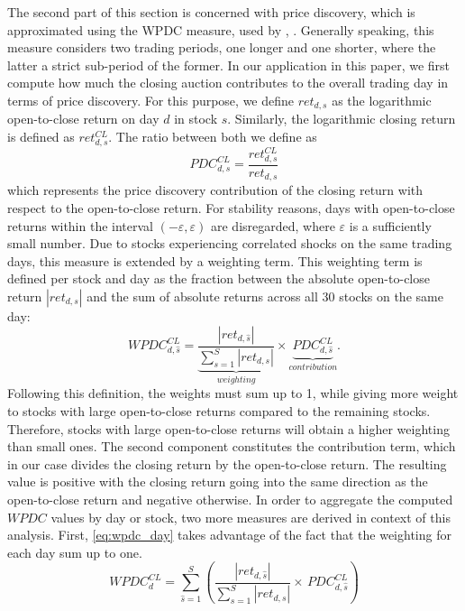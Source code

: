 \documentclass[11pt,a4paper, notitlepage]{article}
\begin{document}
	The second part of this section is concerned with price discovery, which is approximated using the \ac{WPDC} measure, used by \textcite{BarclayWarner1993}, \textcite{BarclayHendershott2003}. Generally speaking, this measure considers two trading periods, one longer and one shorter, where the latter a strict sub-period of the former. In our application in this paper, we first compute how much the closing auction contributes to the overall trading day in terms of price discovery. For this purpose, we define $ret_{d,s}$ as the logarithmic open-to-close return on day $d$ in stock $s$. Similarly, the logarithmic closing return is defined as $ret^{CL}_{d,s}$. The ratio between both we define as
	\begin{equation*}
		PDC^{CL}_{d,s} = \frac{ret^{CL}_{d,s}}{ret_{d,s}}
	\end{equation*}
	which represents the price discovery contribution of the closing return with respect to the open-to-close return. For stability reasons, days with open-to-close returns within the interval $(-\varepsilon, \varepsilon)$ are disregarded, where $\varepsilon$ is a sufficiently small number. Due to stocks experiencing correlated shocks on the same trading days, this measure is extended by a weighting term. This weighting term is defined per stock and day as the fraction between the absolute open-to-close return $|ret_{d,s}|$ and the sum of absolute returns across all 30 stocks on the same day:
	\begin{equation}
		\label{eq:wpdc_base}
		WPDC^{CL}_{d,\hat{s}} = \underbrace{\frac{|ret_{d,\hat{s}}|}{\sum_{s=1}^{S} |ret_{d,s}|}}_{weighting}  \times \underbrace{PDC^{CL}_{d,\hat{s}}}_{contribution}.
	\end{equation}
	Following this definition, the weights must sum up to 1, while giving more weight to stocks with large open-to-close returns compared to the remaining stocks. Therefore, stocks with large open-to-close returns will obtain a higher weighting than small ones. The second component constitutes the contribution term, which in our case divides the closing return by the open-to-close return. The resulting value is positive with the closing return going into the same direction as the open-to-close return and negative otherwise. In order to aggregate the computed $WPDC$ values by day or stock, two more measures are derived in context of this analysis. First, \cref{eq:wpdc_day} takes advantage of the fact that the weighting for each day sum up to one.
	\begin{equation}
		\label{eq:wpdc_day}
		WPDC^{CL}_{d} = \sum_{\hat{s}=1}^{S} \left( \frac{|ret_{d,\hat{s}}|}{\sum_{s=1}^{S} |ret_{d,s}|} \times \, PDC^{CL}_{d,\hat{s}} \right)
	\end{equation}
\end{document}
